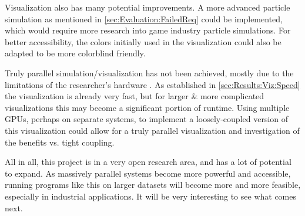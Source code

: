 Visualization also has many potential improvements.
A more advanced particle simulation as mentioned in \cref{sec:Evaluation:FailedReq} could be implemented, which would require more research into game industry particle simulations.
For better accessibility, the colors initially used in the visualization could also be adapted to be more colorblind friendly.

Truly parallel simulation/visualization has not been achieved, mostly due to the limitations of the researcher's hardware .
As established in \cref{sec:Results:Viz:Speed} the visualization is already very fast, but for larger \& more complicated visualizations this may become a significant portion of runtime.
Using multiple GPUs, perhaps on separate systems, to implement a loosely-coupled version of this visualization could allow for a truly parallel visualization and investigation of the benefits vs. tight coupling.

All in all, this project is in a very open research area, and has a lot of potential to expand.
As massively parallel systems become more powerful and accessible, running programs like this on larger datasets will become more and more feasible, especially in industrial applications.
It will be very interesting to see what comes next.
